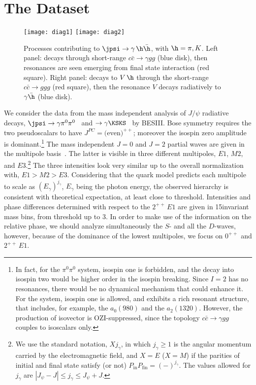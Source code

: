 \section{The Dataset}
\label{sec:data}



\begin{figure}[t]
{\centering
\texttt{[image: diag1]} \hspace{0.5cm} \texttt{[image: diag2]}}
\caption{Processes contributing to $\jpsi \to \gamma \,\h\bar \h$, with $\h = \pi,K$. Left panel: \jpsi decays through short-range $c\bar c \to \gamma gg$ (blue disk), then resonances are seen emerging from final state interaction (red square). Right panel: \jpsi decays to $V\,\h$ through the short-range $c\bar c \to ggg$ (red square), then the resonance $V$ decays radiatively to $\gamma \bar \h$ (blue disk).}
\label{fig:proces}
\end{figure}

We consider the data from the 
  mass independent analysis of $J/\psi$ 
   radiative decays, 
    $\jpsi \to \gamma\pi^0\pi^0$~\cite{Ablikim:2015umt} and $\to \gamma \KSKS$~\cite{Ablikim:2018izx} 
     by BESIII. 
Bose symmetry requires the two pseudoscalars to have $J^{PC}=\text{(even)}^{++}$; moreover the isospin zero amplitude is dominant.\footnote{In fact, for the $\pi^0\pi^0$ system, isospin one is forbidden, and the decay into isospin two  would be higher order in the isospin breaking. Since $I=2$ has no resonances, there would be no dynamical mechanism that could enhance it. For the \KSKS system, isospin one is allowed, and exhibits a rich resonant structure, that includes, for example, the $a_0(980)$ and the $a_2(1320)$. However, the production of isovector is OZI-suppressed, since the topology  $c\bar c\to \gamma gg$ couples to isoscalars only. }
The mass independent $J=0$ and $J=2$ partial waves are given in the multipole basis~\cite{sebastian:1992xq}. 
  The latter is visible in three different multipoles, $E1$, $M2$, and $E3$.\footnote{We use the standard notation,  $Xj_\gamma$, in which 
   $j_\gamma \ge 1$ is the angular momentum carried by the electromagnetic field, and $X=E$ ($X=M$) if the parities of initial and final state satisfy (or not) $P_\text{in} P_\text{fin} = (-)^{j_\gamma}$. The values allowed for $j_\gamma$ are $|J_\psi - J| \le j_\gamma \le J_\psi + J$.} The three intensities look very similar up to the overall normalization with,  $E1 > M2 > E3$. 
  Considering that the quark model predicts each multipole to scale as $(E_\gamma)^{j_\gamma}$, $E_\gamma$ being the photon energy, the observed 
      hierarchy is consistent with theoretical expectation, at  least close to threshold. 
  Intensities and
phase differences determined with respect to the $2^{++}\,E1$ are given in 15\mev invariant mass bins, from
threshold up to 3\gev. In order to make use of the information on the relative phase, we should analyze simultaneously the $S$- and all the $D$-waves, however, 
 because of the dominance of the lowest multipoles,
   we focus on $0^{++}$ and $2^{++}\,E1$. 


